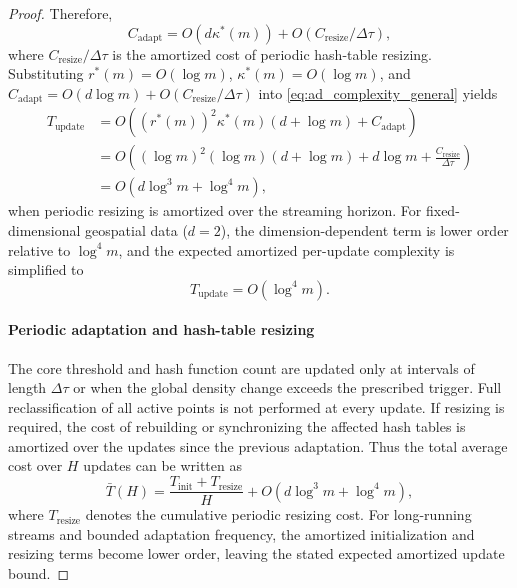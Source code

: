 \documentclass[preprint,12pt,authoryear]{elsarticle}
\theoremstyle{definition}
\begin{document}
\begin{proof}
Therefore,
\begin{equation}
C_{\mathrm{adapt}}
=O(d\kappa^*(m))+O(C_{\mathrm{resize}}/\Delta\tau),
\end{equation}
where $C_{\mathrm{resize}}/\Delta\tau$ is the amortized cost of periodic hash-table resizing. Substituting $r^*(m)=O(\log m)$, $\kappa^*(m)=O(\log m)$, and $C_{\mathrm{adapt}}=O(d\log m)+O(C_{\mathrm{resize}}/\Delta\tau)$ into \eqref{eq:ad_complexity_general} yields
\begin{align}
T_{\mathrm{update}}
&=O\!\left((r^*(m))^2\kappa^*(m)(d+\log m)+C_{\mathrm{adapt}}\right) \\
&=O\!\left((\log m)^2(\log m)(d+\log m)+d\log m+\frac{C_{\mathrm{resize}}}{\Delta\tau}\right) \\
&=O\!\left(d\log^3 m+\log^4 m\right),
\end{align}
when periodic resizing is amortized over the streaming horizon. For fixed-dimensional geospatial data ($d=2$), the dimension-dependent term is lower order relative to $\log^4 m$, and the expected amortized per-update complexity is simplified to
\begin{equation}
T_{\mathrm{update}}=O(\log^4 m).
\end{equation}

\paragraph{Periodic adaptation and hash-table resizing}
The core threshold and hash function count are updated only at intervals of length $\Delta\tau$ or when the global density change exceeds the prescribed trigger. Full reclassification of all active points is not performed at every update. If resizing is required, the cost of rebuilding or synchronizing the affected hash tables is amortized over the updates since the previous adaptation. Thus the total average cost over $H$ updates can be written as
\begin{equation}
\bar{T}(H)=\frac{T_{\mathrm{init}}+T_{\mathrm{resize}}}{H}+O(d\log^3 m+\log^4 m),
\end{equation}
where $T_{\mathrm{resize}}$ denotes the cumulative periodic resizing cost. For long-running streams and bounded adaptation frequency, the amortized initialization and resizing terms become lower order, leaving the stated expected amortized update bound.


\end{proof}
\end{document}
